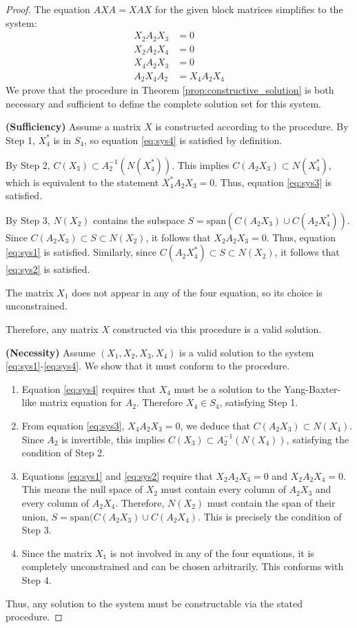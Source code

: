 \documentclass{article}
\begin{document}
\begin{proof}
  The equation $AXA = XAX$ for the given block matrices simplifies to the system:
  \begin{align}
    X_2 A_2 X_3 &= 0 \label{eq:sys1}\\
    X_2 A_2 X_4 &= 0 \label{eq:sys2}\\
    X_4 A_2 X_3 &= 0 \label{eq:sys3}\\
    A_2 X_4 A_2 &= X_4 A_2 X_4 \label{eq:sys4}
  \end{align}
  We prove that the procedure in Theorem \ref{prop:constructive_solution} is both necessary and sufficient to define the complete solution set for this system.

  \textbf{(Sufficiency)}
  Assume a matrix $X$ is constructed according to the procedure.
  By Step 1, $X_4^*$ is in $S_4$, so equation \eqref{eq:sys4} is satisfied by definition.

  By Step 2, $C(X_3) \subset A_2^{-1} (N(X_4^*))$.
  This implies $C(A_2 X_3) \subset N(X_4^*)$, which is equivalent to the statement $X_4^* A_2 X_3 = 0$.
  Thus, equation \eqref{eq:sys3} is satisfied.

  By Step 3, $N(X_2)$ contains the subspace $S = \text{span}(C(A_2 X_3) \cup C(A_2 X_4^*))$.
  Since $C(A_2 X_3) \subset S \subset N(X_2)$, it follows that $X_2 A_2 X_3 = 0$.
  Thus, equation \eqref{eq:sys1} is satisfied.
  Similarly, since $C(A_2 X_4^*) \subset S \subset N(X_2)$, it follows that \eqref{eq:sys2} is satisfied.

  The matrix $X_1$ does not appear in any of the four equation, so its choice is unconstrained.

  Therefore, any matrix $X$ constructed via this procedure is a valid solution.

  \textbf{(Necessity)}
  Assume $(X_1, X_2, X_3, X_4)$ is a valid solution to the system \eqref{eq:sys1}-\eqref{eq:sys4}.
  We show that it must conform to the procedure.
  \begin{enumerate}
    \item Equation \eqref{eq:sys4} requires that $X_4$ must be a solution to the Yang-Baxter-like matrix equation for $A_2$.
      Therefore $X_4 \in S_4$, satisfying Step 1.
    \item From equation \eqref{eq:sys3}, $X_4 A_2 X_3 = 0$, we deduce that $C(A_2 X_3) \subset N(X_4)$.
      Since $A_2$ is invertible, this implies $C(X_3) \subset A_2^{-1} (N(X_4))$, satisfying the condition of Step 2.
    \item Equations \eqref{eq:sys1} and \eqref{eq:sys2} require that $X_2 A_2 X_3 = 0$ and $X_2 A_2 X_4 = 0$.
      This means the null space of $X_2$ must contain every column of $A_2 X_3$ and every column of $A_2 X_4$.
      Therefore, $N(X_2)$ must contain the span of their union, $S = \text{span} (C(A_2 X_3) \cup C(A_2 X_4)$.
      This is precisely the condition of Step 3.
    \item Since the matrix $X_1$ is not involved in any of the four equations, it is completely unconstrained and can be chosen arbitrarily.
      This conforms with Step 4.
  \end{enumerate}

  Thus, any solution to the system must be constructable via the stated procedure.
\end{proof}
\end{document}
